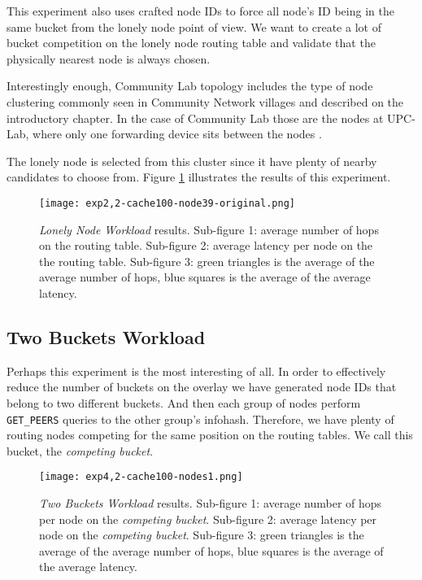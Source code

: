 \documentclass[conference]{IEEEtran}
\begin{document}
This experiment also uses crafted node IDs to force all node's ID being in the same bucket from the lonely node point of view. We want to create a lot of bucket competition on the lonely node routing table and validate that the physically nearest node is always chosen.

Interestingly enough, Community Lab topology includes the type of node clustering commonly seen in Community Network villages and described on the introductory chapter. In the case of Community Lab those are the nodes at UPC-Lab, where only one forwarding device sits between the nodes \cite{b19}.

The lonely node is selected from this cluster since it have plenty of nearby candidates to choose from. Figure \ref{fig:exp2,2-cache100-node39-original} illustrates the results of this experiment.

\begin{figure}
    \texttt{[image: exp2,2-cache100-node39-original.png]}
    \caption{\textit{Lonely Node Workload} results. Sub-figure 1: average number of hops on the routing table. Sub-figure 2: average latency per node on the the routing table. Sub-figure 3: green triangles is the average of the average number of hops, blue squares is the average of the average latency.}
    \label{fig:exp2,2-cache100-node39-original}
\end{figure}


\subsection{Two Buckets Workload}

Perhaps this experiment is the most interesting of all. In order to effectively reduce the number of buckets on the overlay we have generated node IDs that belong to two different buckets. And then each group of nodes perform \texttt{GET\_PEERS} queries to the other group's infohash. Therefore, we have plenty of routing nodes competing for the same position on the routing tables. We call this bucket, the \textit{competing bucket}.

\begin{figure}
    \texttt{[image: exp4,2-cache100-nodes1.png]}
    \caption{\textit{Two Buckets Workload} results. Sub-figure 1: average number of hops per node on the \textit{competing bucket}. Sub-figure 2: average latency per node on the \textit{competing bucket}. Sub-figure 3: green triangles is the average of the average number of hops, blue squares is the average of the average latency.}
    \label{fig:exp4,2-cache100-nodes1}
\end{figure}
\end{document}
